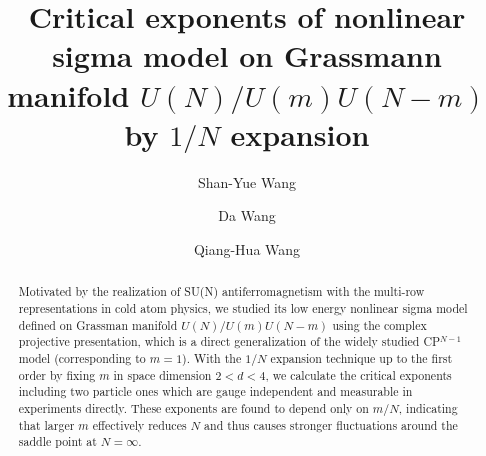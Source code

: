 \documentclass[aps,twocolumn,superscriptaddress]{revtex4-1}
\begin{document}
\title{Critical exponents of nonlinear sigma model on Grassmann manifold $U(N)/U(m)U(N-m)$ by $1/N$ expansion}
\author{Shan-Yue Wang}
\author{Da Wang} %
\author{Qiang-Hua Wang} %
\begin{abstract}
    Motivated by the realization of SU(N) antiferromagnetism with the multi-row representations in cold atom physics, we studied its low energy nonlinear sigma model defined on Grassman manifold
  $U(N)/U(m)U(N-m)$ using the complex projective presentation, which is a direct generalization of the widely studied
  CP$^{N-1}$ model (corresponding to $m=1$). With the $1/N$ expansion technique up to the first order by fixing $m$ in space dimension
  $2<d<4$, we calculate the critical exponents including two particle ones which are gauge independent and measurable in experiments directly. These exponents are found to depend only on $m/N$, indicating that larger $m$ effectively reduces $N$ and thus causes stronger fluctuations around the saddle point at $N=\infty$.
\end{abstract}
\maketitle
\end{document}

